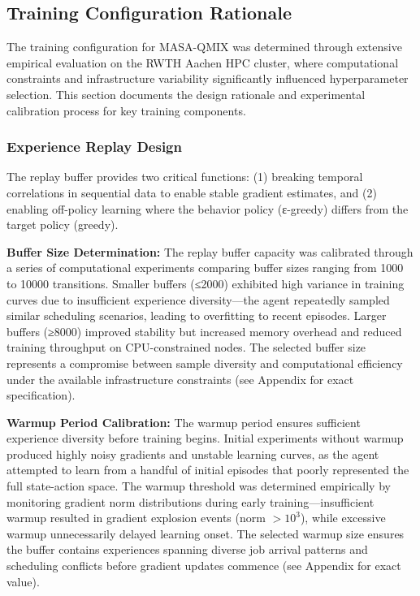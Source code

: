 \subsection{Training Configuration Rationale}

The training configuration for MASA-QMIX was determined through extensive empirical evaluation on the RWTH Aachen HPC cluster, where computational constraints and infrastructure variability significantly influenced hyperparameter selection. This section documents the design rationale and experimental calibration process for key training components.

\subsubsection{Experience Replay Design}

The replay buffer provides two critical functions: (1) breaking temporal correlations in sequential data to enable stable gradient estimates, and (2) enabling off-policy learning where the behavior policy (ε-greedy) differs from the target policy (greedy). 

\textbf{Buffer Size Determination:} The replay buffer capacity was calibrated through a series of computational experiments comparing buffer sizes ranging from 1000 to 10000 transitions. Smaller buffers (≤2000) exhibited high variance in training curves due to insufficient experience diversity—the agent repeatedly sampled similar scheduling scenarios, leading to overfitting to recent episodes. Larger buffers (≥8000) improved stability but increased memory overhead and reduced training throughput on CPU-constrained nodes. The selected buffer size represents a compromise between sample diversity and computational efficiency under the available infrastructure constraints (see Appendix for exact specification).

\textbf{Warmup Period Calibration:} The warmup period ensures sufficient experience diversity before training begins. Initial experiments without warmup produced highly noisy gradients and unstable learning curves, as the agent attempted to learn from a handful of initial episodes that poorly represented the full state-action space. The warmup threshold was determined empirically by monitoring gradient norm distributions during early training—insufficient warmup resulted in gradient explosion events (norm $>10^3$), while excessive warmup unnecessarily delayed learning onset. The selected warmup size ensures the buffer contains experiences spanning diverse job arrival patterns and scheduling conflicts before gradient updates commence (see Appendix for exact value).

